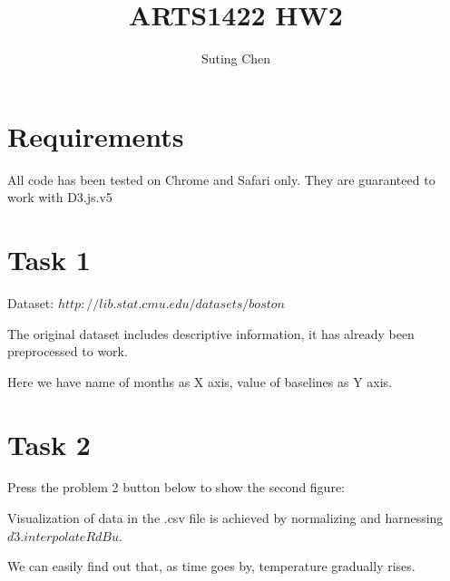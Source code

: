 \documentclass[]{article}
\title{ARTS1422 HW2}
\author{Suting Chen}
\begin{document}
    \maketitle


    \section{Requirements}
    All code has been tested on Chrome and Safari only. They are guaranteed to work with D3.js.v5


    \section{Task 1}
    Dataset: $http://lib.stat.cmu.edu/datasets/boston$

    The original dataset includes descriptive information, it has already been preprocessed to work.
    \begin{center}
    \end{center}
    Here we have name of months as X axis, value of baselines as Y axis.

    \newpage


    \section{Task 2}
    Press the problem 2 button below to show the second figure:
    \begin{center}
    \end{center}
    Visualization of data in the .csv file is achieved by normalizing and harnessing $d3.interpolateRdBu$.

    We can easily find out that, as time goes by, temperature gradually rises.
\end{document}
